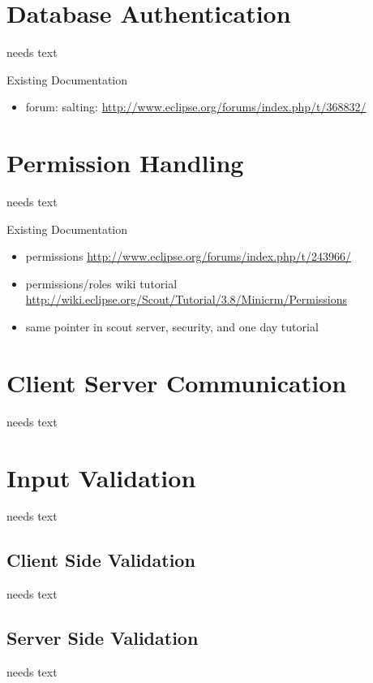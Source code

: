 \documentclass[a4paper,10pt,twoside]{book}
\begin{document}
\section{Database Authentication}
needs text

\noindent Existing Documentation
\begin{itemize}
  \item forum: salting: \url{http://www.eclipse.org/forums/index.php/t/368832/}
\end{itemize}

\section{Permission Handling}
needs text

\noindent Existing Documentation
\begin{itemize}
  \item permissions \url{http://www.eclipse.org/forums/index.php/t/243966/}
  \item permissions/roles wiki tutorial \url{http://wiki.eclipse.org/Scout/Tutorial/3.8/Minicrm/Permissions}
  \item same pointer in scout server, security, and one day tutorial
\end{itemize}

\section{Client Server Communication}
needs text

\section{Input Validation}
needs text

\subsection{Client Side Validation}
needs text

\subsection{Server Side Validation}
needs text
\end{document}
